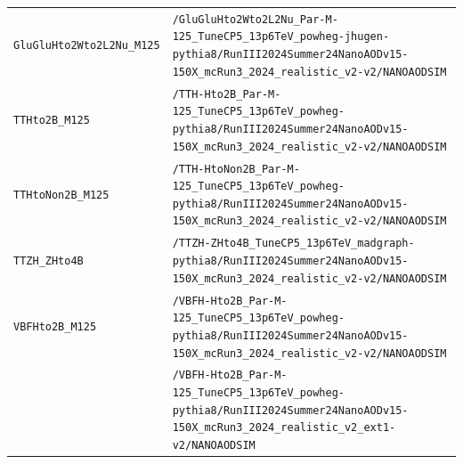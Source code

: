 \begin{longtable}{@{}>{\RaggedRight\arraybackslash}p{} >{\RaggedRight\arraybackslash}p{}@{}}
\addlinespace[2pt]
\texttt{GluGluHto2Wto2L2Nu\_\allowbreak{}M125} & \texttt{/\allowbreak{}GluGluHto2Wto2L2Nu\_\allowbreak{}Par-\allowbreak{}M-\allowbreak{}125\_\allowbreak{}TuneCP5\_\allowbreak{}13p6TeV\_\allowbreak{}powheg-\allowbreak{}jhugen-\allowbreak{}pythia8/\allowbreak{}RunIII2024Summer24NanoAODv15-\allowbreak{}150X\_\allowbreak{}mcRun3\_\allowbreak{}2024\_\allowbreak{}realistic\_\allowbreak{}v2-\allowbreak{}v2/\allowbreak{}NANOAODSIM} \\
\addlinespace[2pt]
\texttt{TTHto2B\_\allowbreak{}M125} & \texttt{/\allowbreak{}TTH-\allowbreak{}Hto2B\_\allowbreak{}Par-\allowbreak{}M-\allowbreak{}125\_\allowbreak{}TuneCP5\_\allowbreak{}13p6TeV\_\allowbreak{}powheg-\allowbreak{}pythia8/\allowbreak{}RunIII2024Summer24NanoAODv15-\allowbreak{}150X\_\allowbreak{}mcRun3\_\allowbreak{}2024\_\allowbreak{}realistic\_\allowbreak{}v2-\allowbreak{}v2/\allowbreak{}NANOAODSIM} \\
\addlinespace[2pt]
\texttt{TTHtoNon2B\_\allowbreak{}M125} & \texttt{/\allowbreak{}TTH-\allowbreak{}HtoNon2B\_\allowbreak{}Par-\allowbreak{}M-\allowbreak{}125\_\allowbreak{}TuneCP5\_\allowbreak{}13p6TeV\_\allowbreak{}powheg-\allowbreak{}pythia8/\allowbreak{}RunIII2024Summer24NanoAODv15-\allowbreak{}150X\_\allowbreak{}mcRun3\_\allowbreak{}2024\_\allowbreak{}realistic\_\allowbreak{}v2-\allowbreak{}v2/\allowbreak{}NANOAODSIM} \\
\addlinespace[2pt]
\texttt{TTZH\_\allowbreak{}ZHto4B} & \texttt{/\allowbreak{}TTZH-\allowbreak{}ZHto4B\_\allowbreak{}TuneCP5\_\allowbreak{}13p6TeV\_\allowbreak{}madgraph-\allowbreak{}pythia8/\allowbreak{}RunIII2024Summer24NanoAODv15-\allowbreak{}150X\_\allowbreak{}mcRun3\_\allowbreak{}2024\_\allowbreak{}realistic\_\allowbreak{}v2-\allowbreak{}v2/\allowbreak{}NANOAODSIM} \\
\addlinespace[2pt]
\texttt{VBFHto2B\_\allowbreak{}M125} & \texttt{/\allowbreak{}VBFH-\allowbreak{}Hto2B\_\allowbreak{}Par-\allowbreak{}M-\allowbreak{}125\_\allowbreak{}TuneCP5\_\allowbreak{}13p6TeV\_\allowbreak{}powheg-\allowbreak{}pythia8/\allowbreak{}RunIII2024Summer24NanoAODv15-\allowbreak{}150X\_\allowbreak{}mcRun3\_\allowbreak{}2024\_\allowbreak{}realistic\_\allowbreak{}v2-\allowbreak{}v2/\allowbreak{}NANOAODSIM} \\
 & \texttt{/\allowbreak{}VBFH-\allowbreak{}Hto2B\_\allowbreak{}Par-\allowbreak{}M-\allowbreak{}125\_\allowbreak{}TuneCP5\_\allowbreak{}13p6TeV\_\allowbreak{}powheg-\allowbreak{}pythia8/\allowbreak{}RunIII2024Summer24NanoAODv15-\allowbreak{}150X\_\allowbreak{}mcRun3\_\allowbreak{}2024\_\allowbreak{}realistic\_\allowbreak{}v2\_\allowbreak{}ext1-\allowbreak{}v2/\allowbreak{}NANOAODSIM} \\

\end{longtable}
